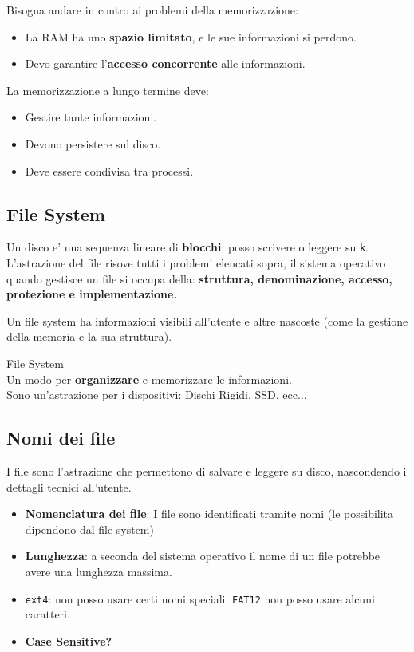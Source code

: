 Bisogna andare in contro ai problemi della memorizzazione:
\begin{itemize}
    \item La RAM ha uno \textbf{spazio limitato}, e le sue informazioni si perdono.
    \item Devo garantire l'\textbf{accesso concorrente} alle informazioni.
\end{itemize}

La memorizzazione a lungo termine deve:
\begin{itemize}
    \item Gestire tante informazioni.
    \item Devono persistere sul disco.
    \item Deve essere condivisa tra processi.
\end{itemize}

\subsection{File System}
Un disco e' una sequenza lineare di \textbf{blocchi}: posso scrivere o leggere su \texttt{k}.
L'astrazione del file risove tutti i problemi elencati sopra, il sistema operativo quando gestisce un file
si occupa della: \textbf{struttura, denominazione, accesso, protezione e implementazione.}

Un file system ha informazioni visibili all'utente e altre nascoste (come la gestione della memoria e la sua struttura).

\begin{definition} File System \\
    Un modo per \textbf{organizzare} e memorizzare le informazioni. \\
    Sono un'astrazione per i dispositivi: Dischi Rigidi, SSD, ecc...
\end{definition}

\subsection{Nomi dei file}
I file sono l'astrazione che permettono di salvare e leggere su disco, nascondendo i dettagli tecnici all'utente.
\begin{itemize}
    \item \textbf{Nomenclatura dei file}: I file sono identificati tramite nomi (le possibilita dipendono dal file system)
    \item \textbf{Lunghezza}: a seconda del sistema operativo il nome di un file potrebbe avere una lunghezza massima.
    \item \texttt{ext4}: non posso usare certi nomi speciali. \texttt{FAT12} non posso usare alcuni caratteri.
    \item \textbf{Case Sensitive?}
\end{itemize}

